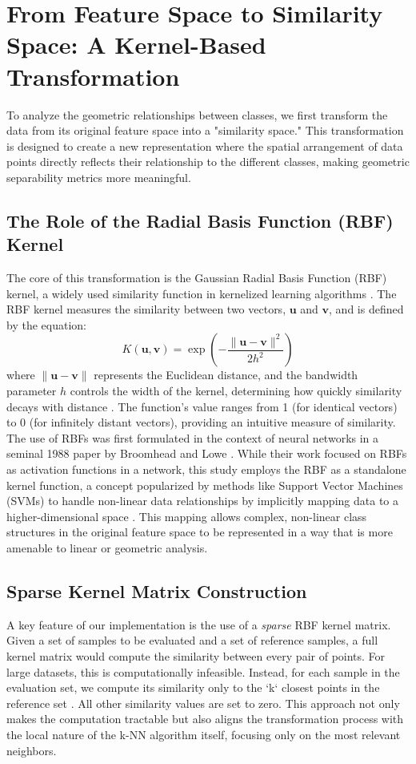 \documentclass[conference]{IEEEtran}
\begin{document}
\section{From Feature Space to Similarity Space: A Kernel-Based Transformation}
To analyze the geometric relationships between classes, we first transform the data from its original feature space into a "similarity space." This transformation is designed to create a new representation where the spatial arrangement of data points directly reflects their relationship to the different classes, making geometric separability metrics more meaningful.

\subsection{The Role of the Radial Basis Function (RBF) Kernel}
The core of this transformation is the Gaussian Radial Basis Function (RBF) kernel, a widely used similarity function in kernelized learning algorithms \cite{b18, b19}. The RBF kernel measures the similarity between two vectors, $\mathbf{u}$ and $\mathbf{v}$, and is defined by the equation:
\begin{equation}
K(\mathbf{u}, \mathbf{v}) = \exp\left(-\frac{\|\mathbf{u} - \mathbf{v}\|^2}{2h^2}\right)
\end{equation}
where $\|\mathbf{u} - \mathbf{v}\|$ represents the Euclidean distance, and the bandwidth parameter $h$ controls the width of the kernel, determining how quickly similarity decays with distance \cite{b18, b20}. The function's value ranges from 1 (for identical vectors) to 0 (for infinitely distant vectors), providing an intuitive measure of similarity. The use of RBFs was first formulated in the context of neural networks in a seminal 1988 paper by Broomhead and Lowe \cite{b21, b22}. While their work focused on RBFs as activation functions in a network, this study employs the RBF as a standalone kernel function, a concept popularized by methods like Support Vector Machines (SVMs) to handle non-linear data relationships by implicitly mapping data to a higher-dimensional space \cite{b18, b19}. This mapping allows complex, non-linear class structures in the original feature space to be represented in a way that is more amenable to linear or geometric analysis.

\subsection{Sparse Kernel Matrix Construction}
A key feature of our implementation is the use of a \textit{sparse} RBF kernel matrix. Given a set of samples to be evaluated and a set of reference samples, a full kernel matrix would compute the similarity between every pair of points. For large datasets, this is computationally infeasible. Instead, for each sample in the evaluation set, we compute its similarity only to the `k` closest points in the reference set \cite{b20}. All other similarity values are set to zero. This approach not only makes the computation tractable but also aligns the transformation process with the local nature of the k-NN algorithm itself, focusing only on the most relevant neighbors.
\end{document}
